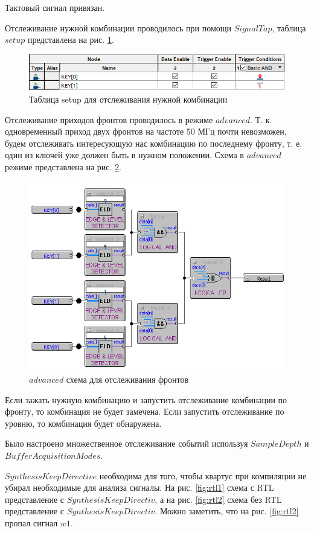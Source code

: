 \documentclass[a4paper,14pt]{article}
\begin{document}
	Тактовый сигнал привязан.
	
	Отслеживание нужной комбинации проводилось при помощи $SignalTap$, таблица $setup$ представлена на рис. \ref{fig:setupkey1}.
	
	\begin{figure}[H]
		\centering
		\includegraphics[width=0.7\linewidth]{images/setup_key_1}
		\caption{Таблица setup для отслеживания нужной комбинации}
		\label{fig:setupkey1}
	\end{figure}

	Отслеживание приходов фронтов проводилось в режиме $advanced$.
	Т. к. одновременный приход двух фронтов на частоте 50 МГц почти невозможен, будем отслеживать интересующую нас комбинацию по последнему фронту, т. е. один из ключей уже должен быть в нужном положении.
	Схема в $advanced$ режиме представлена на рис. \ref{fig:advancedscheme}.

	\begin{figure}[H]
		\centering
		\includegraphics[width=0.7\linewidth]{images/advanced_scheme}
		\caption{$advanced$ схема для отслеживания фронтов}
		\label{fig:advancedscheme}
	\end{figure}

	Если зажать нужную комбинацию и запустить отслеживание комбинации по фронту, то комбинация не будет замечена.
	Если запустить отслеживание по уровню, то комбинация будет обнаружена.
	
	Было настроено множественное отслеживание событий используя $Sample Depth$ и $Buffer Acquisition Modes$.

	$Synthesis Keep Directive$ необходима для того, чтобы квартус при компиляции не убирал необходимые для анализа сигналы.
	На рис. \ref{fig:rtl1} схема с RTL представление с $Synthesis Keep Directiv$, а на рис. \ref{fig:rtl2} схема без RTL представление с $Synthesis Keep Directiv$.
	Можно заметить, что на рис. \ref{fig:rtl2} пропал сигнал $w1$.
	
\end{document}
